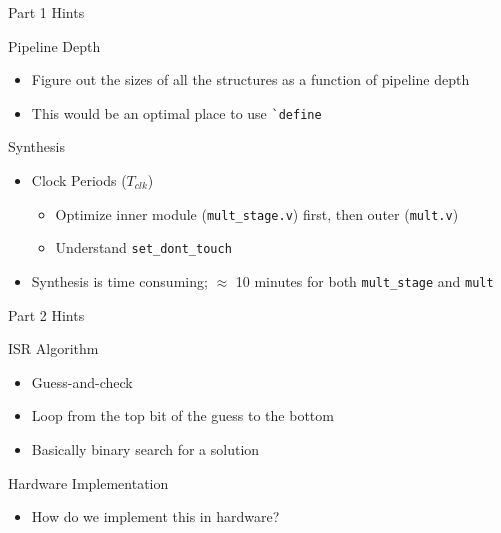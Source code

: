 \documentclass[dvipsnames]{beamer}
\begin{document}
\begin{frame}{Part 1 Hints}
	\begin{block}{Pipeline Depth}
		\begin{itemize}
			\item Figure out the sizes of all the structures as a function 
				of pipeline depth
			\item This would be an optimal place to use \texttt{\`{}define}
		\end{itemize}
	\end{block}
	\begin{block}{Synthesis}
		\begin{itemize}
			\item Clock Periods ($T_{clk}$)
				\begin{itemize}
					\item Optimize inner module (\texttt{mult\_stage.v}) first,
						then outer (\texttt{mult.v})
					\item Understand \texttt{set\_dont\_touch}
				\end{itemize}
			\item Synthesis is time consuming; $\approx$ 10 minutes for both
				\texttt{mult\_stage} and \texttt{mult}
		\end{itemize}
	\end{block}
\end{frame}

\begin{frame}{Part 2 Hints}
	\begin{block}{ISR Algorithm}
		\begin{itemize}
			\item Guess-and-check
			\item Loop from the top bit of the guess to the bottom
			\item Basically binary search for a solution
		\end{itemize}
	\end{block}
	\begin{block}{Hardware Implementation}
		\begin{itemize}
			\item How do we implement this in hardware?
		\end{itemize}
	\end{block}
\end{frame}
\end{document}
